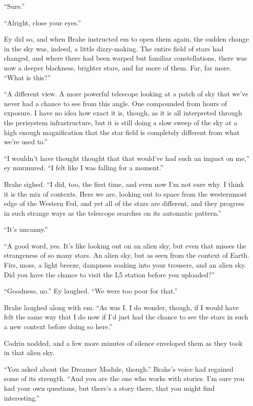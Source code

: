 ``Sure.''

``Alright, close your eyes.''

Ey did so, and when Brahe instructed em to open them again, the sudden change in the sky was, indeed, a little dizzy-making. The entire field of stars had changed, and where there had been warped but familiar constellations, there was now a deeper blackness, brighter stars, and far more of them. Far, far more. ``What is this?''

``A different view. A more powerful telescope looking at a patch of sky that we've never had a chance to see from this angle. One compounded from hours of exposure. I have no idea how exact it is, though, as it is all interpreted through the perisystem infrastructure, but it is still doing a slow sweep of the sky at a high enough magnification that the star field is completely different from what we're used to.''

``I wouldn't have thought thought that that would've had such an impact on me,'' ey murmured. ``I felt like I was falling for a moment.''

Brahe sighed. ``I did, too, the first time, and even now I'm not sure why. I think it is the mix of contexts. Here we are, looking out to space from the westernmost edge of the Western Fed, and yet all of the stars are different, and they progress in such strange ways as the telescope searches on its automatic pattern.''

``It's uncanny.''

``A good word, yes. It's like looking out on an alien sky, but even that misses the strangeness of so many stars. An alien sky, but as seen from the context of Earth. Firs, moss, a light breeze, dampness soaking into your trousers, and an alien sky. Did you have the chance to visit the L5 station before you uploaded?''

``Goodness, no.'' Ey laughed. ``We were too poor for that.''

Brahe laughed along with em. ``As was I. I do wonder, though, if I would have felt the same way that I do now if I'd just had the chance to see the stars in such a new context before doing so here.''

Codrin nodded, and a few more minutes of silence enveloped them as they took in that alien sky.

``You asked about the Dreamer Module, though.'' Brahe's voice had regained some of its strength. ``And you are the one who works with stories. I'm sure you had your own questions, but there's a story there, that you might find interesting.''

